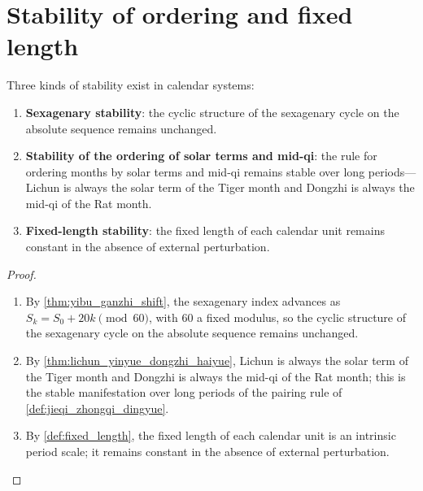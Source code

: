 \section{Stability of ordering and fixed length}
\label{sec:calendar_stability}

\begin{theorem}\label{thm:calendar_stability}
Three kinds of stability exist in calendar systems:
\begin{enumerate}[label=(\roman*)]
    \item \textbf{Sexagenary stability}: the cyclic structure of the sexagenary cycle on the absolute sequence remains unchanged.
    \item \textbf{Stability of the ordering of solar terms and mid-qi}: the rule for ordering months by solar terms and mid-qi remains stable over long periods---Lichun is always the solar term of the Tiger month and Dongzhi is always the mid-qi of the Rat month.
    \item \textbf{Fixed-length stability}: the fixed length of each calendar unit remains constant in the absence of external perturbation.
\end{enumerate}
\end{theorem}

\begin{proof}
\begin{enumerate}[label=(\roman*)]
\item By \cref{thm:yibu_ganzhi_shift}, the sexagenary index advances as \(S_k=S_0+20k\pmod{60}\), with \(60\) a fixed modulus, so the cyclic structure of the sexagenary cycle on the absolute sequence remains unchanged.
\item By \cref{thm:lichun_yinyue_dongzhi_haiyue}, Lichun is always the solar term of the Tiger month and Dongzhi is always the mid-qi of the Rat month; this is the stable manifestation over long periods of the pairing rule of \cref{def:jieqi_zhongqi_dingyue}.
\item By \cref{def:fixed_length}, the fixed length of each calendar unit is an intrinsic period scale; it remains constant in the absence of external perturbation.
\end{enumerate}
\end{proof}

